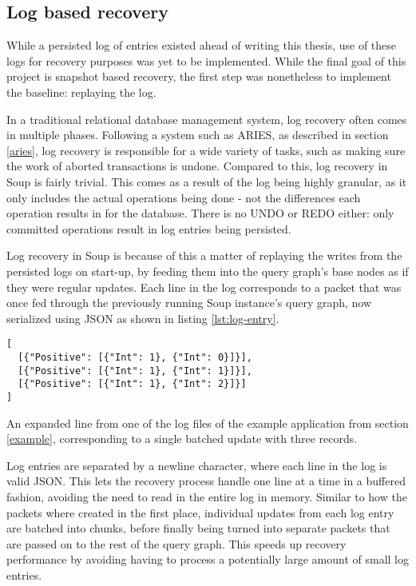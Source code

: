\documentclass[b5paper]{report}
\begin{document}
\subsection{Log based recovery}
While a persisted log of entries existed ahead of writing this thesis, use of
these logs for recovery purposes was yet to be implemented. While the final goal
of this project is snapshot based recovery, the first step was nonetheless to
implement the baseline: replaying the log.

In a traditional relational database management system, log recovery often comes
in multiple phases. Following a system such as ARIES, as described in section
\ref{aries}, log recovery is responsible for a wide variety of tasks, such as
making sure the work of aborted transactions is undone. Compared to this, log
recovery in Soup is fairly trivial. This comes as a result of the log being
highly granular, as it only includes the actual operations being done - not the
differences each operation results in for the database. There is no UNDO or REDO
either: only committed operations result in log entries being persisted.

Log recovery in Soup is because of this a matter of replaying the writes from
the persisted logs on start-up, by feeding them into the query graph's base
nodes as if they were regular updates. Each line in the log corresponds to a
packet that was once fed through the previously running Soup instance's query
graph, now serialized using JSON as shown in listing \ref{lst:log-entry}.

\begin{listing}[H]
  \begin{verbatim}
[
  [{"Positive": [{"Int": 1}, {"Int": 0}]}],
  [{"Positive": [{"Int": 1}, {"Int": 1}]}],
  [{"Positive": [{"Int": 1}, {"Int": 2}]}]
]
  \end{verbatim}
  \caption{
    An expanded line from one of the log files of the example application from section
    \ref{example}, corresponding to a single batched update with three records.
    \label{lst:log-entry}
  }
\end{listing}

Log entries are separated by a newline character, where each line in the log
is valid JSON. This lets the recovery process handle one line at a time in a
buffered fashion, avoiding the need to read in the entire log in memory. Similar
to how the packets where created in the first place, individual updates from
each log entry are batched into chunks, before finally being turned into
separate packets that are passed on to the rest of the query graph. This speeds
up recovery performance by avoiding having to process a potentially large
amount of small log entries.
\end{document}

